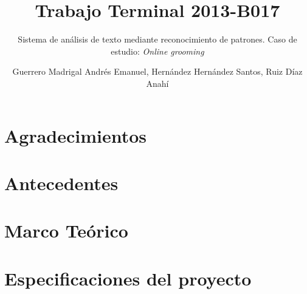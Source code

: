 \documentclass[oneside,10pt]{book}
\title{Trabajo Terminal 2013-B017}
\subtitle{Sistema de an\'alisis de texto mediante reconocimiento de patrones. Caso de estudio: \textit{Online grooming}}
\author{Guerrero Madrigal Andr\'es Emanuel, Hern\'andez Hern\'andez Santos, Ruiz D\'iaz Anah\'i}
\begin{document}
\sloppy 




\chapter*{Agradecimientos}



\thispagestyle{empty}

\frontmatter
\tableofcontents
\frontmatter
\listoffigures %
\frontmatter
\listoftables %

\mainmatter

\chapter{Antecedentes}





\chapter{Marco Te\'orico}




%
%
%
%




%



\chapter{Especificaciones del proyecto}




\end{document}
